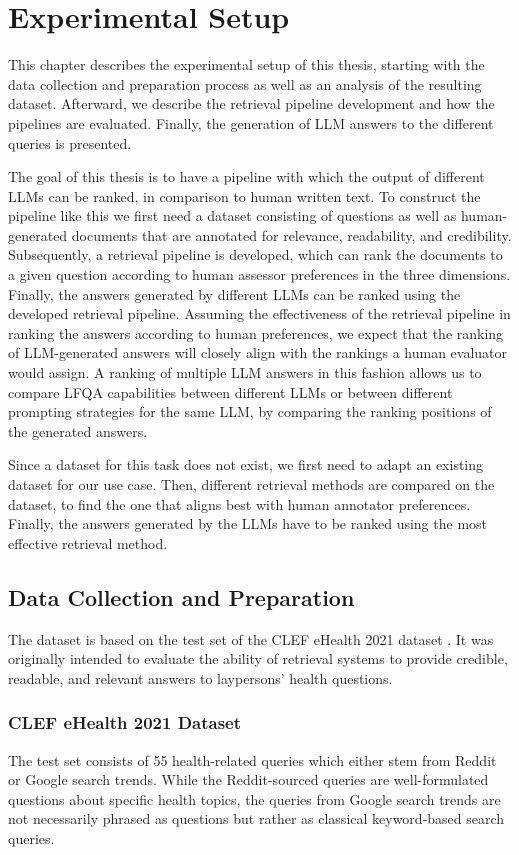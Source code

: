 \chapter{Experimental Setup}\label{experimental-setup}
This chapter describes the experimental setup of this thesis, starting with the data collection and preparation process as well as an analysis of the resulting dataset.
Afterward, we describe the retrieval pipeline development and how the pipelines are evaluated.
Finally, the generation of LLM answers to the different queries is presented.

The goal of this thesis is to have a pipeline with which the output of different LLMs can be ranked, in comparison to human written text.
To construct the pipeline like this we first need a dataset consisting of questions as well as human-generated documents that are annotated for relevance, readability, and credibility.
Subsequently, a retrieval pipeline is developed, which can rank the documents to a given question according to human assessor preferences in the three dimensions.
Finally, the answers generated by different LLMs can be ranked using the developed retrieval pipeline.
Assuming the effectiveness of the retrieval pipeline in ranking the answers according to human preferences, we expect that the ranking of LLM-generated answers will closely align with the rankings a human evaluator would assign.
A ranking of multiple LLM answers in this fashion allows us to compare LFQA capabilities between different LLMs or between different prompting strategies for the same LLM, by comparing the ranking positions of the generated answers.

Since a dataset for this task does not exist, we first need to adapt an existing dataset for our use case.
Then, different retrieval methods are compared on the dataset, to find the one that aligns best with human annotator preferences.
Finally, the answers generated by the LLMs have to be ranked using the most effective retrieval method.

\section{Data Collection and Preparation}\label{sec:dataset}
The dataset is based on the test set of the CLEF eHealth 2021 dataset \cite{goeuriot:2021:Consumer}.
It was originally intended to evaluate the ability of retrieval systems to provide credible, readable, and relevant answers to laypersons' health questions.

\subsection{CLEF eHealth 2021 Dataset}
The test set consists of 55 health-related queries which either stem from Reddit or Google search trends.
While the Reddit-sourced queries are well-formulated questions about specific health topics, the queries from Google search trends are not necessarily phrased as questions but rather as classical keyword-based search queries.

